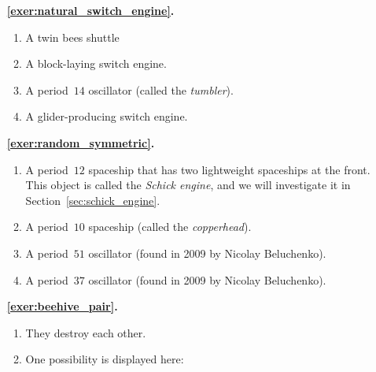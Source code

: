 \begin{multicols}{2}
	\begin{itemize}[leftmargin=0em]
		\item[\bf\color{ocre}\sffamily\ref{exer:natural_switch_engine}.] \begin{enumerate}[leftmargin=1.5em,label=\bf\color{ocre}(\alph*)]
			\item A twin bees shuttle
			
			\item A block-laying switch engine.
			
			\item A period~$14$ oscillator (called the \emph{tumbler}).
			
			\item A glider-producing switch engine. \\
		\end{enumerate}
		
		
		\item[\bf\color{ocre}\sffamily\ref{exer:random_symmetric}.] \begin{enumerate}[leftmargin=1.5em,label=\bf\color{ocre}(\alph*)]
			\item A period~$12$ spaceship that has two lightweight spaceships at the front. This object is called the \emph{Schick engine}, and we will investigate it in Section~\ref{sec:schick_engine}.
			
			\item A period~$10$ spaceship (called the \emph{copperhead}).
			
			\item A period~$51$ oscillator (found in 2009 by Nicolay Beluchenko).
			
			\item A period~$37$ oscillator (found in 2009 by Nicolay Beluchenko). \\
		\end{enumerate}
		
		
		\item[\bf\color{ocre}\sffamily\ref{exer:beehive_pair}.] \begin{enumerate}[leftmargin=1.5em,label=\bf\color{ocre}(\alph*)]
			\item They destroy each other.
			
			\item One possibility is displayed here: \\[-0.6em]
			
			 \\
		\end{enumerate}
		

\end{itemize}
\end{multicols}
